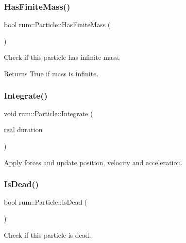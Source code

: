 \subsubsection{\texorpdfstring{Has\+Finite\+Mass()}{HasFiniteMass()}}
{\footnotesize\ttfamily bool rum\+::\+Particle\+::\+Has\+Finite\+Mass (\begin{DoxyParamCaption}{ }\end{DoxyParamCaption})}

Check if this particle has infinite mass. \begin{DoxyReturn}{Returns}
True if mass is infinite. 
\end{DoxyReturn}
\mbox{\label{classrum_1_1_particle_ac2200e991b81a380177275d6dd04ab64}} 
\subsubsection{\texorpdfstring{Integrate()}{Integrate()}}
{\footnotesize\ttfamily void rum\+::\+Particle\+::\+Integrate (\begin{DoxyParamCaption}\item[{\hyperlink{namespacerum_a7e8cca23573d5eaead0f138cbaa4862c}{real}}]{duration }\end{DoxyParamCaption})\hspace{0.3cm}{\ttfamily [virtual]}}

Apply forces and update position, velocity and acceleration. \mbox{\label{classrum_1_1_particle_af9cc5e4971981a3ad4c59370aa80a6ee}} 
\subsubsection{\texorpdfstring{Is\+Dead()}{IsDead()}}
{\footnotesize\ttfamily bool rum\+::\+Particle\+::\+Is\+Dead (\begin{DoxyParamCaption}{ }\end{DoxyParamCaption})}

Check if this particle is dead. \mbox{\label{classrum_1_1_particle_a541556744b743995687bfabd42be67eb}} 
